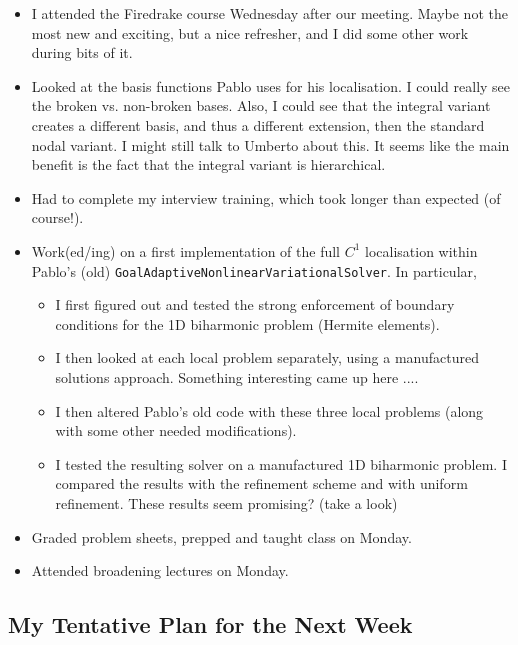 \documentclass[12pt,a4paper]{article}
\begin{document}
\begin{itemize}
    \item I attended the Firedrake course Wednesday after our meeting. Maybe not the most new and exciting, but a nice refresher, and I did some other work during bits of it. 
    \item Looked at the basis functions Pablo uses for his localisation. I could really see the broken vs. non-broken bases. Also, I could see that the integral variant creates a different basis, and thus a different extension, then the standard nodal variant. I might still talk to Umberto about this. It seems like the main benefit is the fact that the integral variant is hierarchical. 
    \item Had to complete my interview training, which took longer than expected (of course!).
    \item Work(ed/ing) on a first implementation of the full $C^1$ localisation within Pablo's (old) \texttt{GoalAdaptiveNonlinearVariationalSolver}. In particular, 
    \begin{itemize}
        \item I first figured out and tested the strong enforcement of boundary conditions for the 1D biharmonic problem (Hermite elements).
        \item I then looked at each local problem separately, using a manufactured solutions approach. Something interesting came up here .... 
        \item I then altered Pablo's old code with these three local problems (along with some other needed modifications). 
        \item I tested the resulting solver on a manufactured 1D biharmonic problem. I compared the results with the refinement scheme and with uniform refinement. These results seem promising? (take a look)
        
    \end{itemize}
    \item Graded problem sheets, prepped and taught class on Monday.
    \item Attended broadening lectures on Monday.
\end{itemize}
\newpage 
\subsection{My Tentative Plan for the Next Week}
\end{document}
